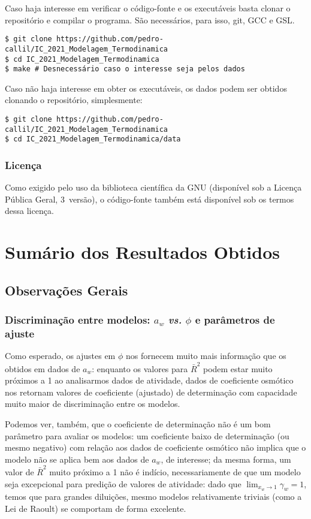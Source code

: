\documentclass[
	12pt,				%
	openright,
	twoside,
	a4paper,			%
	english,			%
	french,				%
	spanish,			%
	brazil				%
	]{abntex2}
\begin{document}
Caso haja interesse em verificar o código-fonte e os executáveis basta clonar o
repositório e compilar o programa. São necessários, para isso, git, GCC e GSL.

\begin{verbatim}
$ git clone https://github.com/pedro-callil/IC_2021_Modelagem_Termodinamica
$ cd IC_2021_Modelagem_Termodinamica
$ make # Desnecessário caso o interesse seja pelos dados
\end{verbatim}

Caso não haja interesse em obter os executáveis, os dados podem ser obtidos
clonando o repositório, simplesmente:

\begin{verbatim}
$ git clone https://github.com/pedro-callil/IC_2021_Modelagem_Termodinamica
$ cd IC_2021_Modelagem_Termodinamica/data
\end{verbatim}

\subsection{Licença}

Como exigido pelo uso da biblioteca científica da GNU (disponível sob a Licença
Pública Geral, 3\textordfeminine\ versão), o código-fonte também está disponível
sob os termos dessa licença.

\chapter{Sumário dos Resultados Obtidos}

\section{Observações Gerais}

\subsection{Discriminação entre modelos: $a_w$ \textit{vs.} $\phi$ e %
parâmetros de ajuste}

Como esperado, os ajustes em $\phi$ nos fornecem muito mais informação que os
obtidos em dados de $a_w$: enquanto os valores para $\bar{R}^2$ podem estar
muito próximos a 1 ao analisarmos dados de atividade, dados de coeficiente
osmótico nos retornam valores de coeficiente (ajustado) de determinação com
capacidade muito maior de discriminação entre os modelos.

Podemos ver, também, que o coeficiente de determinação não é um bom parâmetro para
avaliar os modelos: um coeficiente baixo de determinação (ou mesmo negativo) com
relação aos dados de coeficiente osmótico não implica que o modelo não se aplica
bem aos dados de $a_w$, de interesse; da mesma forma, um valor de $\bar{R}^2$ muito
próximo a 1 não é indício, necessariamente de que um modelo seja excepcional para
predição de valores de atividade: dado que $\lim_{x_w \to 1}\gamma_w = 1$, temos
que para grandes diluições, mesmo modelos relativamente triviais (como a Lei de
Raoult) se comportam de forma excelente.
\end{document}
